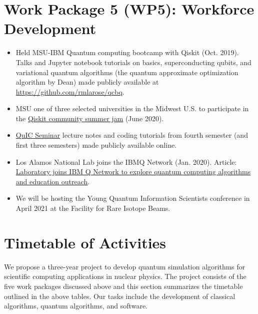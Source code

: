 \documentclass[11pt]{article}
\begin{document}
\section{Work Package 5 (WP5): Workforce Development}

\begin{itemize}
    \item Held MSU-IBM Quantum computing bootcamp with Qiskit (Oct. 2019).
        \subitem Talks and Jupyter notebook tutorials on basics, superconducting qubits, and variational quantum algorithms (the quantum approximate optimization algorithm by Dean)  made publicly available at \href{https://github.com/rmlarose/qcbq}{https://github.com/rmlarose/qcbq}.
    
    \item MSU one of three selected universities in the Midwest U.S. to participate in the \href{https://www.hackerearth.com/challenges/hackathon/qiskit-community-summer-jam-mid-west/}{Qiskit community summer jam} (June 2020).
    
    \item \href{https://www.ryanlarose.com/quic-seminar.html}{QuIC Seminar} lecture notes and coding tutorials from fourth semester (and first three semesters) made publicly available online.
    
    \item Los Alamos National Lab joins the IBMQ Network (Jan. 2020).
        \subitem Article: \href{https://www.lanl.gov/discover/news-release-archive/2020/January/0109-quantum-computing-algorithms.php?source=newsroom}{Laboratory joins IBM Q Network to explore quantum computing algorithms and education outreach}.

    \item We will be hosting the Young Quantum Information Scientists conference in April 2021 at the Facility for Rare Isotope Beams.     
    
\end{itemize}


\section{Timetable of Activities}
We propose a three-year project to develop quantum simulation algorithms for scientific computing applications in nuclear physics. The project consists of the five work packages discussed above and this section summarizes the timetable outlined in the above tables. Our tasks include the development of classical algorithms, quantum algorithms, and software.
\end{document}
